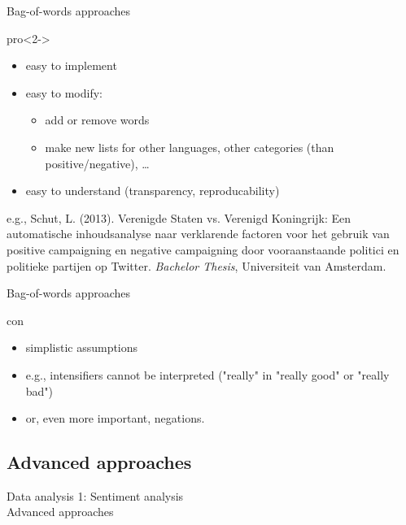 \documentclass{beamer}
\begin{document}
\begin{frame}{Bag-of-words approaches}
\begin{block}{pro}<2->
\begin{itemize}
\item easy to implement
\item easy to modify:
\begin{itemize}
\item add or remove words
\item make new lists for other languages, other categories (than positive/negative), \dots
\end{itemize}
\item easy to understand (transparency, reproducability)
\end{itemize}
\end{block}
\par
\tiny{e.g., Schut, L. (2013). Verenigde Staten vs. Verenigd Koningrijk: Een automatische inhoudsanalyse naar verklarende factoren voor het gebruik van positive campaigning en negative campaigning door vooraanstaande politici en politieke partijen op Twitter. \emph{Bachelor Thesis}, Universiteit van Amsterdam.}\\
\end{frame}



\begin{frame}{Bag-of-words approaches}
\begin{block}{con}
\begin{itemize}
\item simplistic assumptions
\item e.g., intensifiers cannot be interpreted ("really" in "really good" or "really bad")
\item or, even more important, negations.
\end{itemize}
\end{block}
\end{frame}



\subsection{Advanced approaches}
\begin{frame}
Data analysis 1: Sentiment analysis\\
Advanced approaches
\end{frame}
\end{document}
